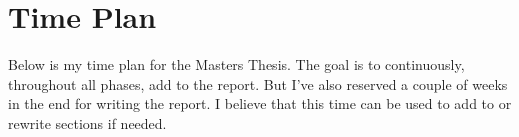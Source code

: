 \documentclass{../kththesis}
\begin{document}
\section{Time Plan}
Below is my time plan for the Masters Thesis. The goal is to continuously, throughout all phases, add to the report. But I've also reserved a couple of weeks in the end for writing the report. I believe that this time can be used to add to or rewrite sections if needed. \\ \\

\begin{ganttchart}{1}{20}
	 \\
	\\
	 \\
	 \\
	 \\
	 \\
	 \\
	 \\
\end{ganttchart}

\printbibliography[heading=bibintoc] %
\end{document}
